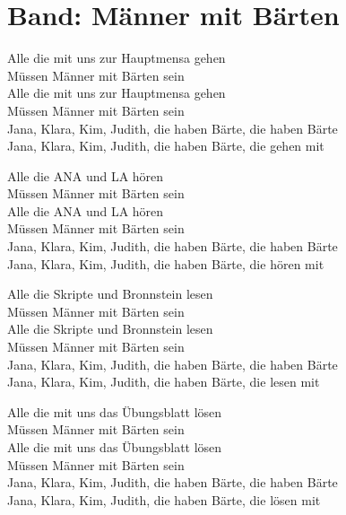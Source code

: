 \newpage
\section{Band: Männer mit Bärten}
\label{sec:band_maenner}
\charaktere{\Chor \Sing}


\begin{verseplay}[10em]
\s{\Sing} Alle die mit uns zur Hauptmensa gehen\\
Müssen Männer mit Bärten sein\\
Alle die mit uns zur Hauptmensa gehen\\
Müssen Männer mit Bärten sein\\
\s{\Chor}Jana, Klara, Kim, Judith, die haben Bärte, die haben Bärte\\
Jana, Klara, Kim, Judith, die haben Bärte, die gehen mit\\ 
\end{verseplay}
\begin{verseplay}[10em]


\s{\Sing} Alle die ANA und LA hören \\
Müssen Männer mit Bärten sein\\
Alle die ANA und LA hören \\
Müssen Männer mit Bärten sein\\
\s{\Chor}Jana, Klara, Kim, Judith, die haben Bärte, die haben Bärte\\
Jana, Klara, Kim, Judith, die haben Bärte, die hören mit\\ 

\end{verseplay}
\begin{verseplay}[10em]
\s{\Sing} Alle die Skripte und Bronnstein lesen\\
Müssen Männer mit Bärten sein\\
Alle die Skripte und Bronnstein lesen\\
Müssen Männer mit Bärten sein\\
\s{\Chor}Jana, Klara, Kim, Judith, die haben Bärte, die haben Bärte\\
Jana, Klara, Kim, Judith, die haben Bärte, die lesen mit\\ 
\end{verseplay}
\begin{verseplay}[10em]

\s{\Sing} Alle die mit uns das Übungsblatt lösen\\
Müssen Männer mit Bärten sein\\
Alle die mit uns das Übungsblatt lösen\\
Müssen Männer mit Bärten sein\\
\s{\Chor}Jana, Klara, Kim, Judith, die haben Bärte, die haben Bärte\\
Jana, Klara, Kim, Judith, die haben Bärte, die lösen mit\\ 
\end{verseplay}
